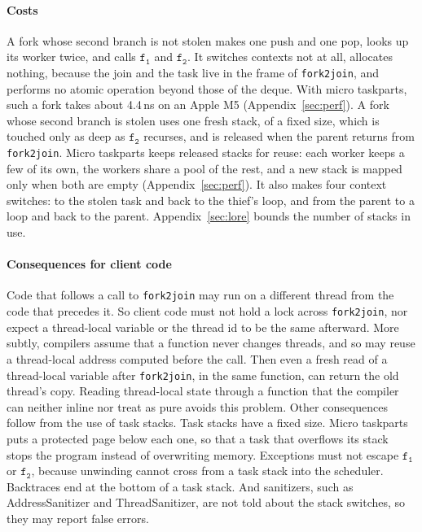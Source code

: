 \documentclass[sigplan,nonacm]{acmart}
\newcommand{\fo}{\mathtt{f_1}}
\newcommand{\ft}{\mathtt{f_2}}
\begin{document}
\paragraph{Costs}
%
A fork whose second branch is not stolen makes one push and one pop,
looks up its worker twice, and calls $\fo$ and $\ft$.
%
It switches contexts not at all, allocates nothing, because the join
and the task live in the frame of \lstinline|fork2join|, and performs
no atomic operation beyond those of the deque.
%
With micro taskparts, such a fork takes about 4.4\,ns on an Apple M5
(Appendix~\ref{sec:perf}).
%
A fork whose second branch is stolen uses one fresh stack, of a
fixed size, which is touched only as deep as $\ft$ recurses, and is
released when the parent returns from \lstinline|fork2join|.
%
Micro taskparts keeps released stacks for reuse: each worker keeps a
few of its own, the workers share a pool of the rest, and a new stack
is mapped only when both are empty (Appendix~\ref{sec:perf}).
%
It also makes four context switches: to the stolen task and back to
the thief's loop, and from the parent to a loop and back to the parent.
%
Appendix~\ref{sec:lore} bounds the number of stacks in use.

\paragraph{Consequences for client code}
%
Code that follows a call to \lstinline|fork2join| may run on a
different thread from the code that precedes it.
%
So client code must not hold a lock across \lstinline|fork2join|, nor
expect a thread-local variable or the thread id to be the same
afterward.
%
More subtly, compilers assume that a function never changes threads,
and so may reuse a thread-local address computed before the call.
%
Then even a fresh read of a thread-local variable after
\lstinline|fork2join|, in the same function, can return the old
thread's copy.
%
Reading thread-local state through a function that the compiler can
neither inline nor treat as pure avoids this problem.
%
Other consequences follow from the use of task stacks.
%
Task stacks have a fixed size.
%
Micro taskparts puts a protected page below each one, so that a task
that overflows its stack stops the program instead of overwriting
memory.
%
Exceptions must not escape $\fo$ or $\ft$, because unwinding cannot
cross from a task stack into the scheduler.
%
Backtraces end at the bottom of a task stack.
%
And sanitizers, such as AddressSanitizer and ThreadSanitizer, are not
told about the stack switches, so they may report false errors.
\end{document}

